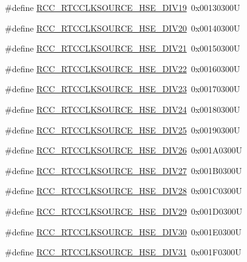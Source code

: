 \begin{DoxyCompactItemize}
\#define \hyperlink{group___r_c_c___r_t_c___clock___source_gaf2d8f6e3e5887bb5c853944fd35b677a}{R\+C\+C\+\_\+\+R\+T\+C\+C\+L\+K\+S\+O\+U\+R\+C\+E\+\_\+\+H\+S\+E\+\_\+\+D\+I\+V19}~0x00130300U
\item 
\#define \hyperlink{group___r_c_c___r_t_c___clock___source_gab72789d4d0c5de2a7e771d538567b92e}{R\+C\+C\+\_\+\+R\+T\+C\+C\+L\+K\+S\+O\+U\+R\+C\+E\+\_\+\+H\+S\+E\+\_\+\+D\+I\+V20}~0x00140300U
\item 
\#define \hyperlink{group___r_c_c___r_t_c___clock___source_ga70a0ee7e610273af753eca611e959dfc}{R\+C\+C\+\_\+\+R\+T\+C\+C\+L\+K\+S\+O\+U\+R\+C\+E\+\_\+\+H\+S\+E\+\_\+\+D\+I\+V21}~0x00150300U
\item 
\#define \hyperlink{group___r_c_c___r_t_c___clock___source_ga02eac6a5a2eec79514d1637c747d69aa}{R\+C\+C\+\_\+\+R\+T\+C\+C\+L\+K\+S\+O\+U\+R\+C\+E\+\_\+\+H\+S\+E\+\_\+\+D\+I\+V22}~0x00160300U
\item 
\#define \hyperlink{group___r_c_c___r_t_c___clock___source_gac707188b45213d39ad11e2440f77e235}{R\+C\+C\+\_\+\+R\+T\+C\+C\+L\+K\+S\+O\+U\+R\+C\+E\+\_\+\+H\+S\+E\+\_\+\+D\+I\+V23}~0x00170300U
\item 
\#define \hyperlink{group___r_c_c___r_t_c___clock___source_gabc9c05156ca310200f3716af4209594a}{R\+C\+C\+\_\+\+R\+T\+C\+C\+L\+K\+S\+O\+U\+R\+C\+E\+\_\+\+H\+S\+E\+\_\+\+D\+I\+V24}~0x00180300U
\item 
\#define \hyperlink{group___r_c_c___r_t_c___clock___source_gaef79b940c2bcfee57380e23c4e893767}{R\+C\+C\+\_\+\+R\+T\+C\+C\+L\+K\+S\+O\+U\+R\+C\+E\+\_\+\+H\+S\+E\+\_\+\+D\+I\+V25}~0x00190300U
\item 
\#define \hyperlink{group___r_c_c___r_t_c___clock___source_gaa3d9b9568edda64d88361e76a3a50ed0}{R\+C\+C\+\_\+\+R\+T\+C\+C\+L\+K\+S\+O\+U\+R\+C\+E\+\_\+\+H\+S\+E\+\_\+\+D\+I\+V26}~0x001\+A0300U
\item 
\#define \hyperlink{group___r_c_c___r_t_c___clock___source_ga65afd29f069e2e9b607212876d7860e5}{R\+C\+C\+\_\+\+R\+T\+C\+C\+L\+K\+S\+O\+U\+R\+C\+E\+\_\+\+H\+S\+E\+\_\+\+D\+I\+V27}~0x001\+B0300U
\item 
\#define \hyperlink{group___r_c_c___r_t_c___clock___source_ga28e7a9291c903b820991c3a3e80c9ae1}{R\+C\+C\+\_\+\+R\+T\+C\+C\+L\+K\+S\+O\+U\+R\+C\+E\+\_\+\+H\+S\+E\+\_\+\+D\+I\+V28}~0x001\+C0300U
\item 
\#define \hyperlink{group___r_c_c___r_t_c___clock___source_gac22536498ea83e12ecd83f04d5e98858}{R\+C\+C\+\_\+\+R\+T\+C\+C\+L\+K\+S\+O\+U\+R\+C\+E\+\_\+\+H\+S\+E\+\_\+\+D\+I\+V29}~0x001\+D0300U
\item 
\#define \hyperlink{group___r_c_c___r_t_c___clock___source_ga5849760bab0f4057bd254cd022dc1a7a}{R\+C\+C\+\_\+\+R\+T\+C\+C\+L\+K\+S\+O\+U\+R\+C\+E\+\_\+\+H\+S\+E\+\_\+\+D\+I\+V30}~0x001\+E0300U
\item 
\#define \hyperlink{group___r_c_c___r_t_c___clock___source_ga074ac97804136221e39f50eb4cf13e3a}{R\+C\+C\+\_\+\+R\+T\+C\+C\+L\+K\+S\+O\+U\+R\+C\+E\+\_\+\+H\+S\+E\+\_\+\+D\+I\+V31}~0x001\+F0300U
\end{DoxyCompactItemize}


